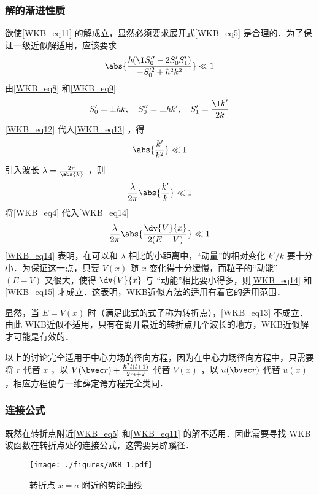 \subsubsection{解的渐进性质}
欲使\autoref{WKB_eq11} 的解成立，显然必须要求展开式\autoref{WKB_eq5} 是合理的．为了保证一级近似解适用，应该要求
\begin{equation}\label{WKB_eq13}
\abs{\frac{\hbar(\I S_0''-2S_0'S_1')}{-S_0'^2+\hbar^2k^2}}\ll1
\end{equation}
由\autoref{WKB_eq8} 和\autoref{WKB_eq9} 
\begin{equation}\label{WKB_eq12}
S_0'=\pm\hbar k,\quad S_0''=\pm\hbar k',\quad S_1'=\frac{\I k'}{2k}
\end{equation}
\autoref{WKB_eq12} 代入\autoref{WKB_eq13} ，得
\begin{equation}
\abs{\frac{k'}{k^2}}\ll1
\end{equation}
引入波长 $\lambda=\frac{2\pi}{\abs{k}}$ ，则
\begin{equation}\label{WKB_eq14}
\frac{\lambda}{2\pi}\abs{\frac{k'}{k}}\ll1
\end{equation}
将\autoref{WKB_eq4} 代入\autoref{WKB_eq14} 
\begin{equation}\label{WKB_eq15}
\frac{\lambda}{2\pi}\abs{\frac{\dv{V}{x}}{2(E-V)}}\ll1
\end{equation}
\autoref{WKB_eq14} 表明，在可以和 $\lambda$ 相比的小距离中，“动量”的相对变化 $k'/k$ 要十分小．为保证这一点，只要 $V(x)$ 随 $x$ 变化得十分缓慢，而粒子的“动能” $(E-V)$ 又很大，使得 $\dv{V}{x}$ 与 “动能”相比要小得多，则\autoref{WKB_eq14} 和\autoref{WKB_eq15} 才成立．这表明，WKB近似方法的适用有着它的适用范围．

显然，当 $E=V(x)$ 时（满足此式的式子称为转折点），\autoref{WKB_eq13} 不成立．由此 WKB近似不适用，只有在离开最近的转折点几个波长的地方，WKB近似解才可能是有效的．

以上的讨论完全适用于中心力场的径向方程，因为在中心力场径向方程中，只需要将 $r$ 代替 $x$ ，以 $V(\bvec r)+\frac{\hbar^2l(l+1)}{2m+2}$ 代替 $V(x)$ ，以 $u(\bvec r)$ 代替 $u(x)$ ，相应方程便与一维薛定谔方程完全类同．
\subsubsection{连接公式}
既然在转折点附近\autoref{WKB_eq5} 和\autoref{WKB_eq11} 的解不适用．因此需要寻找 WKB波函数在转折点处的连接公式，这需要另辟蹊径．
\begin{figure}[ht]
\centering
\texttt{[image: ./figures/WKB\_1.pdf]}
\caption{转折点 $x=a$ 附近的势能曲线} \label{WKB_fig1}
\end{figure}

